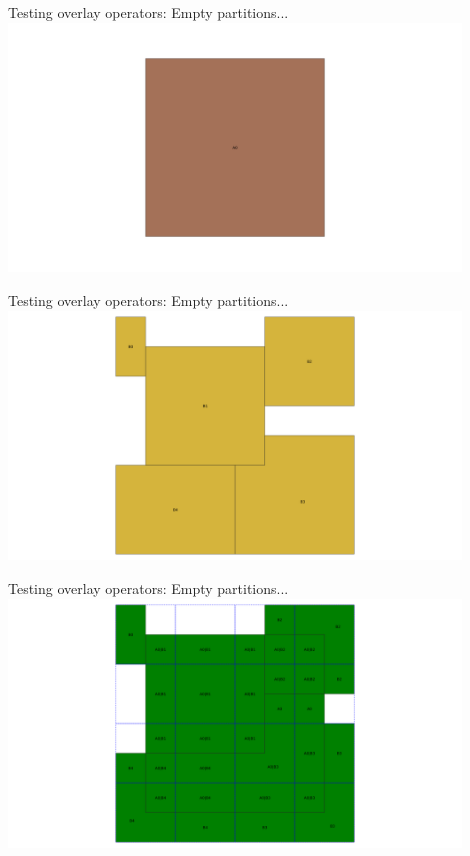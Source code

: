 \documentclass{beamer}
\begin{document}
\begin{frame}{Testing overlay operators: Empty partitions...}
    \centering
	\includegraphics[trim=1cm 0 1cm 0, clip, width=0.9\textwidth]{figures/Demo_A}
\end{frame}
\begin{frame}{Testing overlay operators: Empty partitions...}
    \centering
	\includegraphics[trim=1cm 0 1cm 0, clip, width=0.9\textwidth]{figures/Demo_B}
\end{frame}
\begin{frame}{Testing overlay operators: Empty partitions...}
    \centering
	\includegraphics[trim=1cm 0 1cm 0, clip, width=0.9\textwidth]{figures/Demo_Faces}
\end{frame}
\end{document}
